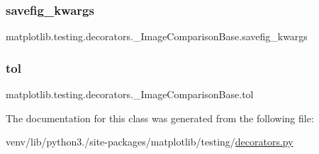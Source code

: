 \subsubsection{\texorpdfstring{savefig\+\_\+kwargs}{savefig\_kwargs}}
{\footnotesize\ttfamily matplotlib.\+testing.\+decorators.\+\_\+\+Image\+Comparison\+Base.\+savefig\+\_\+kwargs}

\mbox{\label{classmatplotlib_1_1testing_1_1decorators_1_1__ImageComparisonBase_a1267da29dd0897aaa1b664755fd5ddf0}} 
\subsubsection{\texorpdfstring{tol}{tol}}
{\footnotesize\ttfamily matplotlib.\+testing.\+decorators.\+\_\+\+Image\+Comparison\+Base.\+tol}



The documentation for this class was generated from the following file\+:\begin{DoxyCompactItemize}
\item 
venv/lib/python3./site-\/packages/matplotlib/testing/\hyperlink{matplotlib_2testing_2decorators_8py}{decorators.\+py}\end{DoxyCompactItemize}
